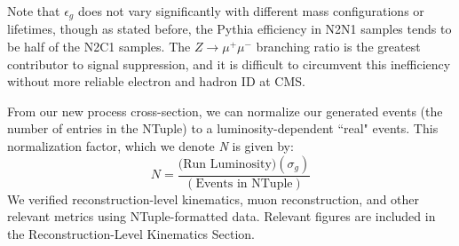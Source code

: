 \documentclass{article}
\begin{document}
\par
Note that $\epsilon_{g}$ does not vary significantly with different mass configurations or lifetimes, though as stated before, the Pythia efficiency in N2N1 samples tends to be half of the N2C1 samples. The $Z\rightarrow \mu^{+}\mu^{-}$ branching ratio is the greatest contributor to signal suppression, and it is difficult to circumvent this inefficiency without more reliable electron and hadron ID at CMS.
\par
From our new process cross-section, we can normalize our generated events (the number of entries in the NTuple) to a luminosity-dependent ``real" events. This normalization factor, which we denote \textit{N} is given by:
\[N = \frac{\text{(Run Luminosity)}(\sigma_{g})}{(\text{Events in NTuple})}\]
We verified reconstruction-level kinematics, muon reconstruction, and other relevant metrics using NTuple-formatted data. Relevant figures are included in the Reconstruction-Level Kinematics Section.
\end{document}
